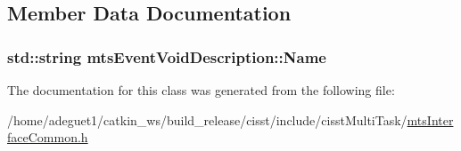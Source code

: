 \subsection{Member Data Documentation}
\hypertarget{classmts_event_void_description_a9738223fff7b80a3152e1acd0bc1a343}{
\subsubsection[{Name}]{\setlength{\rightskip}{0pt plus 5cm}std\-::string mts\-Event\-Void\-Description\-::\-Name}}\label{classmts_event_void_description_a9738223fff7b80a3152e1acd0bc1a343}


The documentation for this class was generated from the following file\-:\begin{DoxyCompactItemize}
\item 
/home/adeguet1/catkin\-\_\-ws/build\-\_\-release/cisst/include/cisst\-Multi\-Task/\hyperlink{mts_interface_common_8h}{mts\-Interface\-Common.\-h}\end{DoxyCompactItemize}
